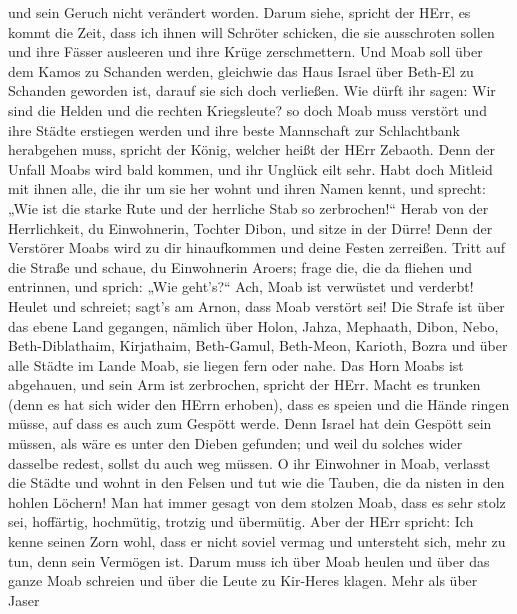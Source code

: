 und sein Geruch nicht verändert worden.  Darum siehe,
spricht der HErr, es kommt die Zeit, dass ich ihnen will Schröter
schicken, die sie ausschroten sollen und ihre Fässer ausleeren und ihre
Krüge zerschmettern.  Und Moab soll über dem Kamos zu
Schanden werden, gleichwie das Haus Israel über Beth-El zu Schanden
geworden ist, darauf sie sich doch verließen.  Wie dürft
ihr sagen: Wir sind die Helden und die rechten Kriegsleute?
 so doch Moab muss verstört und ihre Städte erstiegen
werden und ihre beste Mannschaft zur Schlachtbank herabgehen muss,
spricht der König, welcher heißt der HErr Zebaoth.  Denn
der Unfall Moabs wird bald kommen, und ihr Unglück eilt sehr.
 Habt doch Mitleid mit ihnen alle, die ihr um sie her wohnt
und ihren Namen kennt, und sprecht: „Wie ist die starke Rute und der
herrliche Stab so zerbrochen!{}``  Herab von der
Herrlichkeit, du Einwohnerin, Tochter Dibon, und sitze in der Dürre!
Denn der Verstörer Moabs wird zu dir hinaufkommen und deine Festen
zerreißen.  Tritt auf die Straße und schaue, du Einwohnerin
Aroers; frage die, die da fliehen und entrinnen, und sprich: „Wie
geht's?{}``  Ach, Moab ist verwüstet und verderbt! Heulet
und schreiet; sagt's am Arnon, dass Moab verstört sei!  Die
Strafe ist über das ebene Land gegangen, nämlich über Holon, Jahza,
Mephaath,  Dibon, Nebo, Beth-Diblathaim, 
Kirjathaim, Beth-Gamul, Beth-Meon,  Karioth, Bozra und über
alle Städte im Lande Moab, sie liegen fern oder nahe.  Das
Horn Moabs ist abgehauen, und sein Arm ist zerbrochen, spricht der HErr.
 Macht es trunken (denn es hat sich wider den HErrn
erhoben), dass es speien und die Hände ringen müsse, auf dass es auch
zum Gespött werde.  Denn Israel hat dein Gespött sein
müssen, als wäre es unter den Dieben gefunden; und weil du solches wider
dasselbe redest, sollst du auch weg müssen.  O ihr
Einwohner in Moab, verlasst die Städte und wohnt in den Felsen und tut
wie die Tauben, die da nisten in den hohlen Löchern!  Man
hat immer gesagt von dem stolzen Moab, dass es sehr stolz sei,
hoffärtig, hochmütig, trotzig und übermütig.  Aber der HErr
spricht: Ich kenne seinen Zorn wohl, dass er nicht soviel vermag und
untersteht sich, mehr zu tun, denn sein Vermögen ist. 
Darum muss ich über Moab heulen und über das ganze Moab schreien und
über die Leute zu Kir-Heres klagen.  Mehr als über Jaser
